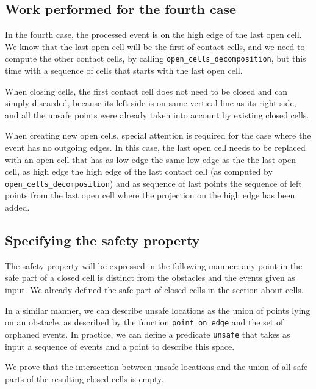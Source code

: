 \documentclass[a4paper, USenglish, cleveref, autoref, thm-restate, final]{lipics-v2021}
\begin{document}
\subsection{Work performed for the fourth case}
In the fourth case, the processed event is on the high edge of the
last open cell.  We know that the last open cell will be the first of
contact cells, and we need to compute the other contact cells, by
calling {\tt open\_cells\_decomposition}, but this time with a sequence
of cells that starts with the last open cell.

When closing cells, the first contact cell does not need to be closed
and can simply discarded, because its left side is on same vertical line as
its right side, and all the unsafe points were already
taken into account by existing closed cells.

When creating new open cells, special attention is required for the
case where the event has no outgoing edges.  In this case, the last
open cell needs to be replaced with an open cell that has as low edge
the same low edge as the the last open cell, as high edge the high
edge of the last contact cell
(as computed by {\tt open\_cells\_decomposition}) and as sequence of
last points the sequence of left points from the last open cell where
the projection on the high edge has been added.

\subsection{Specifying the safety property}
The safety property will
be expressed in the following manner: any point in the safe part of a
closed cell is distinct from the obstacles and the events given as
input.  We already defined the safe part of closed cells in the
section about cells.

In a similar manner, we can describe unsafe locations as the union
of points lying on an obstacle, as described by the function
{\tt point\_on\_edge} and the set of orphaned events.  In practice,
we can define a predicate {\tt unsafe} that takes as input a sequence
of events and a point to describe this space.

We prove that the intersection between unsafe locations and the union
of all safe parts of the resulting closed cells is empty.
\end{document}
